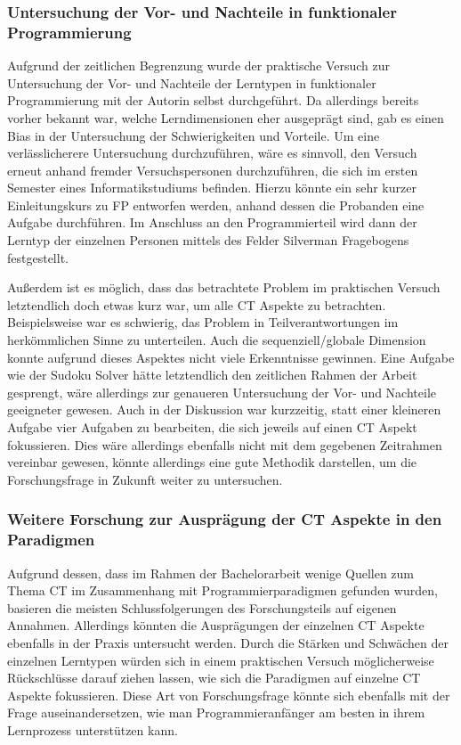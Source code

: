 \subsubsection{Untersuchung der Vor- und Nachteile in funktionaler Programmierung}\label{sec:empirical}
Aufgrund der zeitlichen Begrenzung wurde der praktische Versuch zur Untersuchung der Vor- und Nachteile der Lerntypen in funktionaler Programmierung mit der Autorin selbst durchgeführt. Da allerdings bereits vorher bekannt war, welche Lerndimensionen eher ausgeprägt sind, gab es einen Bias in der Untersuchung der Schwierigkeiten und Vorteile.
Um eine verlässlicherere Untersuchung durchzuführen, wäre es sinnvoll, den Versuch erneut anhand fremder Versuchspersonen durchzuführen, die sich im ersten Semester eines Informatikstudiums befinden.
Hierzu könnte ein sehr kurzer Einleitungskurs zu FP entworfen werden, anhand dessen die Probanden eine Aufgabe durchführen. Im Anschluss an den Programmierteil wird dann der Lerntyp der einzelnen Personen mittels des Felder Silverman Fragebogens festgestellt.

Außerdem ist es möglich, dass das betrachtete Problem im praktischen Versuch letztendlich doch etwas kurz war, um alle CT Aspekte zu betrachten. Beispielsweise war es schwierig, das Problem in Teilverantwortungen im herkömmlichen Sinne zu unterteilen. Auch die sequenziell/globale Dimension konnte aufgrund dieses Aspektes nicht viele Erkenntnisse gewinnen.
Eine Aufgabe wie der Sudoku Solver hätte letztendlich den zeitlichen Rahmen der Arbeit gesprengt, wäre allerdings zur genaueren Untersuchung der Vor- und Nachteile geeigneter gewesen. Auch in der Diskussion war kurzzeitig, statt einer kleineren Aufgabe vier Aufgaben zu bearbeiten, die sich jeweils auf einen CT Aspekt fokussieren. Dies wäre allerdings ebenfalls nicht mit dem gegebenen Zeitrahmen vereinbar gewesen, könnte allerdings eine gute Methodik darstellen, um die Forschungsfrage in Zukunft weiter zu untersuchen.

\subsubsection{Weitere Forschung zur Ausprägung der CT Aspekte in den Paradigmen}
Aufgrund dessen, dass im Rahmen der Bachelorarbeit wenige Quellen zum Thema CT im Zusammenhang mit Programmierparadigmen gefunden wurden, basieren die meisten Schlussfolgerungen des Forschungsteils auf eigenen Annahmen. Allerdings könnten die Ausprägungen der einzelnen CT Aspekte ebenfalls in der Praxis untersucht werden.
Durch die Stärken und Schwächen der einzelnen Lerntypen würden sich in einem praktischen Versuch möglicherweise Rückschlüsse darauf ziehen lassen, wie sich die Paradigmen auf einzelne CT Aspekte fokussieren.
Diese Art von Forschungsfrage könnte sich ebenfalls mit der Frage auseinandersetzen, wie man Programmieranfänger am besten in ihrem Lernprozess unterstützen kann.
